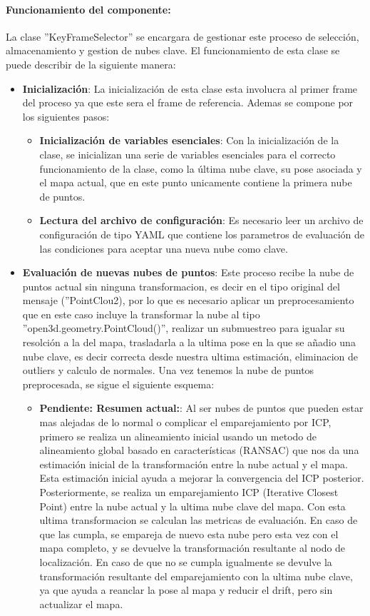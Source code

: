 \documentclass[12pt, a4paper, twoside]{article}
\begin{document}
\paragraph{Funcionamiento del componente:}
La clase ''KeyFrameSelector'' se encargara de gestionar este proceso de selección, almacenamiento y gestion de nubes clave. El funcionamiento de esta clase se puede describir 
de la siguiente manera:
\begin{itemize}
  \item \textbf{Inicialización}: La inicialización de esta clase esta involucra al primer frame del proceso ya que este sera el frame de referencia. Ademas se compone 
  por los siguientes pasos:
  \begin{itemize}
    \item \textbf{Inicialización de variables esenciales}: Con la inicialización de la clase, se inicializan una serie de variables esenciales para el correcto funcionamiento 
    de la clase, como la última nube clave, su pose asociada y el mapa actual, que en este punto unicamente contiene la primera nube de puntos.
    \item \textbf{Lectura del archivo de configuración}: Es necesario leer un archivo de configuración de tipo YAML que contiene los parametros de evaluación de 
    las condiciones para aceptar una nueva nube como clave.
  \end{itemize}
  \item \textbf{Evaluación de nuevas nubes de puntos}: Este proceso recibe la nube de puntos actual sin ninguna transformacion, es decir en el tipo original del mensaje (''PointClou2), 
  por lo que es necesario aplicar un preprocesamiento que en este caso incluye la transformar la nube al tipo ''open3d.geometry.PointCloud()'', realizar un submuestreo para igualar su 
  resolción a la del mapa, trasladarla a la ultima pose en la que se añadio una nube clave, es decir correcta desde nuestra ultima estimación, eliminacion de outliers y calculo de normales. 
  Una vez tenemos la nube de puntos preprocesada, se sigue el siguiente esquema:
  \begin{itemize}
    \item \textbf{Pendiente: Resumen actual:}: 
    Al ser nubes de puntos que pueden estar mas alejadas de lo normal o complicar el emparejamiento por ICP, primero se realiza un alineamiento inicial usando un metodo de
    alineamiento global basado en características (RANSAC) que nos da una estimación inicial de la transformación entre la nube actual y el mapa. Esta estimación inicial ayuda 
    a mejorar la convergencia del ICP posterior. Posteriormente, se realiza un emparejamiento ICP (Iterative Closest Point) entre la nube actual y la ultima nube clave del mapa. 
    Con esta ultima transformacion se calculan las metricas de evaluación. En caso de que las cumpla, se empareja de nuevo esta nube pero esta vez con el mapa completo, y se devuelve
    la transformación resultante al nodo de localización. En caso de que no se cumpla igualmente se devulve la transformación resultante del emparejamiento con la ultima nube clave, ya que
    ayuda a reanclar la pose al mapa y reducir el drift, pero sin actualizar el mapa.
  \end{itemize}
\end{itemize}
\end{document}
